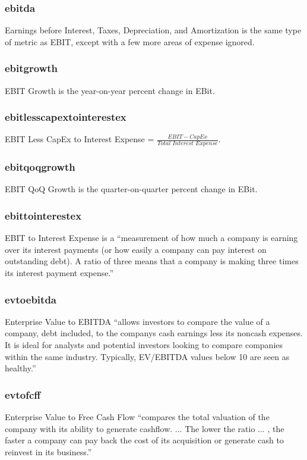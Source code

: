 \subsubsection*{ebitda}
Earnings before Interest, Taxes, Depreciation, and Amortization is the same type of metric as EBIT, except with a few more areas of expense ignored.

\subsubsection*{ebitgrowth}
EBIT Growth is the year-on-year percent change in EBit.

\subsubsection*{ebitlesscapextointerestex}
EBIT Less CapEx to Interest Expense = $\frac{EBIT - CapEx}{Total \,\, Interest \,\, Expense}$.\cite{intrinioDataTags}

\subsubsection*{ebitqoqgrowth}
EBIT QoQ Growth is the quarter-on-quarter percent change in EBit.

\subsubsection*{ebittointerestex}
EBIT to Interest Expense is a ``measurement of how much a company is earning over its interest payments (or how easily a company can pay interest on outstanding debt). A ratio of three means that a company is making three times its interest payment expense.''\cite{intrinioDataTags}

\subsubsection*{evtoebitda} \label{evtoebitda}
Enterprise Value to EBITDA ``allows investors to compare the value of a company, debt included, to the companys cash earnings less its noncash expenses. It is ideal for analysts and potential investors looking to compare companies within the same industry. Typically, EV/EBITDA values below 10 are seen as healthy.''\cite{intrinioDataTags}

\subsubsection*{evtofcff}
Enterprise Value to Free Cash Flow ``compares the total valuation of the company with its ability to generate cashflow. ... The lower the ratio ... , the faster a company can pay back the cost of its acquisition or generate cash to reinvest in its business.''\cite{evtofcf}

